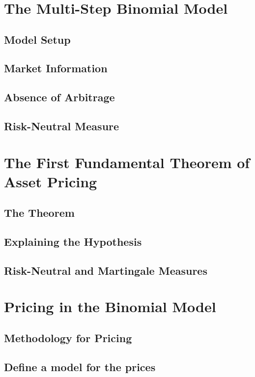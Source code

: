 \documentclass{beamer}
\numberwithin{equation}{section}
\begin{document}
\begin{frame}\frametitle{{\normalsize \secname} \\ {\large \subsecname}}
\end{frame}

\section{The Multi-Step Binomial Model}
\subsection{Model Setup}
\subsection{Market Information}
\subsection{Absence of Arbitrage}
\subsection{Risk-Neutral Measure}

\section{The First Fundamental Theorem of Asset Pricing}
\subsection{The Theorem}
\subsection{Explaining the Hypothesis}
\subsection{Risk-Neutral and Martingale Measures}

\section{Pricing in the Binomial Model}
\subsection{Methodology for Pricing}
\subsection{Define a model for the prices}
\end{document}
